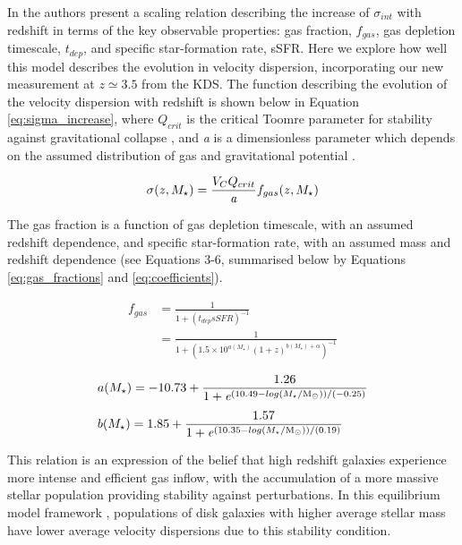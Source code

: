 \documentclass[fleqn,usenatbib]{mnras}
\begin{document}
\noindent
In \cite{Wisnioski2015} the authors present a scaling relation describing the increase of $\sigma_{int}$ with redshift in terms of the key observable properties: gas fraction, $f_{gas}$, gas depletion timescale, $t_{dep}$, and specific star-formation rate, sSFR.
Here we explore how well this model describes the evolution in velocity dispersion, incorporating our new measurement at $z\simeq3.5$ from the KDS.
The function describing the evolution of the velocity dispersion with redshift is shown below in Equation \ref{eq:sigma_increase}, where $Q_{crit}$ is the critical Toomre parameter for stability against gravitational collapse \citep{Toomre1964}, and {\it a} is a dimensionless parameter which depends on the assumed distribution of gas and gravitational potential \cite{ForsterSchreiber2006}. 

\begin{equation}\label{eq:sigma_increase}
    \sigma(z,M_{\star}) = \frac{V_{C}Q_{crit}}{{\it a}}f_{gas}(z,M_{\star})
\end{equation}

\noindent
The gas fraction is a function of gas depletion timescale, with an assumed redshift dependence, and specific star-formation rate, with an assumed mass and redshift dependence (see \citealt{Wisnioski2015} Equations 3-6, summarised below by Equations \ref{eq:gas_fractions} and \ref{eq:coefficients}).

\begin{equation}\label{eq:gas_fractions}
\begin{aligned}
    f_{gas} & = \frac{1}{1 + \left(t_{dep}sSFR\right)^{-1}} \\[1ex]
    & = \frac{1}{1 + \left(1.5\times10^{a(M_{\star})}(1 + z)^{b(M_{\star}) + \alpha}\right)^{-1}}
\end{aligned}
\end{equation}

\begin{equation}\label{eq:coefficients}
\begin{aligned}
   & a(M_{\star}) = -10.73 + \frac{1.26}{1 + {\it e}^{\left(10.49 - log(M_{\star}/{\rm M}_{\odot})\right)/(-0.25)}} \\[1ex]
   & b(M_{\star}) = 1.85 + \frac{1.57}{1 + {\it e}^{\left(10.35 - log(M_{\star}/{\rm M}_{\odot})\right)/(0.19)}}
\end{aligned}
\end{equation}

\noindent
This relation is an expression of the belief that high redshift galaxies experience more intense and efficient gas inflow, with the accumulation of a more massive stellar population providing stability against perturbations.
In this equilibrium model framework \citep[e.g.][]{Dave2012,Lilly2013,Saintonge2013}, populations of disk galaxies with higher average stellar mass have lower average velocity dispersions due to this stability condition.
\end{document}
